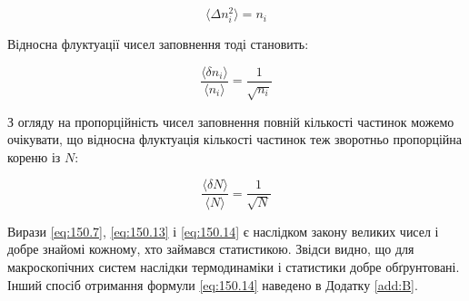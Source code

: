 \begin{equation}
	\langle \Delta n_i^2 \rangle = n_i
	\label{eq:150.12}
\end{equation}

Відносна флуктуації чисел заповнення тоді становить:

\begin{equation}
	\frac{\langle \delta n_i \rangle}{\langle n_i \rangle} = \frac{1}{\sqrt{n_i}}
	\label{eq:150.13}
\end{equation}

З огляду на пропорційність чисел заповнення повній кількості частинок можемо очікувати, що відносна флуктуація кількості частинок теж зворотньо пропорційна кореню із $N$:

\begin{equation}
	\frac{\langle \delta N \rangle}{\langle N \rangle} = \frac{1}{\sqrt{N}}
	\label{eq:150.14}
\end{equation}

Вирази \eqref{eq:150.7}, \eqref{eq:150.13} і \eqref{eq:150.14} є наслідком закону великих чисел і добре знайомі кожному, хто займався статистикою. Звідси видно, що для макроскопічних систем наслідки термодинаміки і статистики добре обґрунтовані. Інший спосіб отримання формули \eqref{eq:150.14} наведено в Додатку \ref{add:B}.

